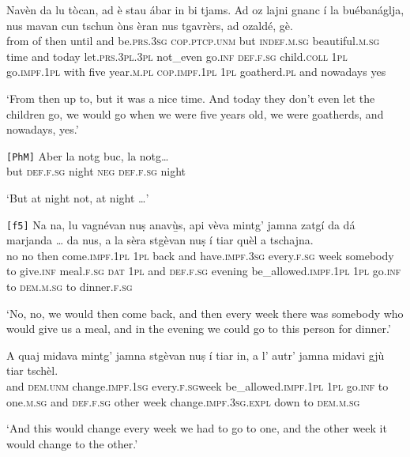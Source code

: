 \begin{linenumbers}
\gll    Navèn da lu tòcan, ad è stau ábar in bi tjams. Ad oz lajni gnanc í la buébanáglja, nus mavan cun tschun òns èran nus tgavrèrs, ad ozaldé, gè.\\
from of then until and  be.\textsc{prs.3sg} \textsc{cop.ptcp.unm} but \textsc{indef.m.sg} beautiful.\textsc{m.sg} time and today let.\textsc{prs.3pl.3pl} not\_even go.\textsc{inf} \textsc{def.f.sg} child.\textsc{coll} \textsc{1pl} go.\textsc{impf.1pl} with five year.\textsc{m.pl}  \textsc{cop.impf.1pl} \textsc{1pl} goatherd.\textsc{pl} and nowadays yes\\
\end{linenumbers}
\medskip
\glt `From then up to, but it was a nice time. And today they don’t even let the children go, we would go when we were five years old, we were goatherds, and nowadays, yes.'
\medskip

\begin{linenumbers}
\gll  \texttt{[PhM]} Aber la notg buc, la notg…\\
\textsc{} but \textsc{def.f.sg} night  \textsc{neg} \textsc{def.f.sg} night  \\
\end{linenumbers}
\medskip
\glt `But at night not, at night …'
\medskip

\begin{linenumbers}
\gll \texttt{[f5]} Na na, lu vagnévan nuṣ anavù̱s, api vèva mintg’ jamna zatgí da dá marjanda … da nus, a la sèra stgèvan nuṣ í tiar quèl a tschajna.\\
{} no no then come.\textsc{impf.1pl} \textsc{1pl} back and have.\textsc{impf.3sg} every.\textsc{f.sg}  week somebody to give.\textsc{inf} meal.\textsc{f.sg} {} \textsc{dat} \textsc{1pl} and \textsc{def.f.sg} evening be\_allowed.\textsc{impf.1pl} \textsc{1pl} go.\textsc{inf} to \textsc{dem.m.sg} to dinner.\textsc{f.sg}\\
\end{linenumbers}
\medskip
\glt `No, no, we would then come back, and then every week there was somebody who would give us a meal, and in the evening we could go to this person for dinner.'
\medskip

\begin{linenumbers}
\gll    A quaj midava mintg’ jamna stgèvan nuṣ í tiar in, a l’ autr’ jamna midavi gjù tiar tschèl. \\
and \textsc{dem.unm} change.\textsc{impf.1sg} every.\textsc{f.sg}week be\_allowed.\textsc{impf.1pl}  \textsc{1pl} go.\textsc{inf} to one.\textsc{m.sg} and \textsc{def.f.sg} other week   change.\textsc{impf.3sg.expl} down to \textsc{dem.m.sg} \\
\end{linenumbers}
\medskip
\glt `And this would change every week we had to go to one, and the other week it would change to the other.'
\medskip

